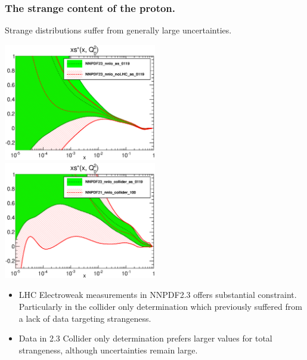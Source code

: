 \documentclass[10pt]{beamer}
\begin{document}
\begin{frame}
\frametitle{The strange content of the proton.}

Strange distributions suffer from generally large uncertainties.

   \includegraphics[width=0.5\textwidth]{pdf_xsplus_log_band_comparison.eps}
   \includegraphics[width=0.5\textwidth]{pdf_xsplus_log_band_comparison_coll.eps}

   \begin{itemize}
   \item<1-> LHC Electroweak measurements in NNPDF2.3 offers substantial constraint. Particularly in the collider only determination which
   previously suffered from a lack of data targeting strangeness.
   \vskip10pt
   \item<1-> Data in 2.3 Collider only determination prefers larger values for total strangeness, although uncertainties remain large.
	\end{itemize}
\end{frame}
\end{document}
